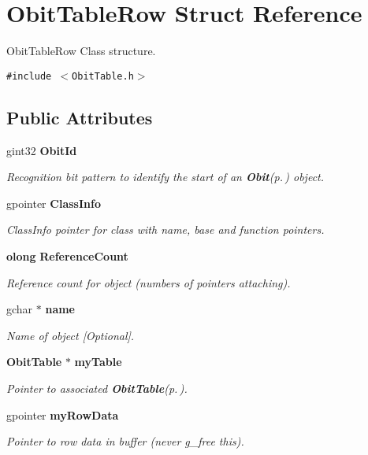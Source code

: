 \section{Obit\-Table\-Row Struct Reference}
\label{structObitTableRow}
Obit\-Table\-Row Class structure.  


{\tt \#include $<$Obit\-Table.h$>$}

\subsection*{Public Attributes}
\begin{CompactItemize}
\item 
gint32 {\bf Obit\-Id}
\begin{CompactList}\small\item\em Recognition bit pattern to identify the start of an {\bf Obit}{\rm (p.\,\pageref{structObit})} object. \item\end{CompactList}\item 
gpointer {\bf Class\-Info}
\begin{CompactList}\small\item\em Class\-Info pointer for class with name, base and function pointers. \item\end{CompactList}\item 
{\bf olong} {\bf Reference\-Count}
\begin{CompactList}\small\item\em Reference count for object (numbers of pointers attaching). \item\end{CompactList}\item 
gchar $\ast$ {\bf name}
\begin{CompactList}\small\item\em Name of object [Optional]. \item\end{CompactList}\item 
{\bf Obit\-Table} $\ast$ {\bf my\-Table}
\begin{CompactList}\small\item\em Pointer to associated {\bf Obit\-Table}{\rm (p.\,\pageref{structObitTable})}. \item\end{CompactList}\item 
gpointer {\bf my\-Row\-Data}
\begin{CompactList}\small\item\em Pointer to row data in buffer (never g\_\-free this). \item\end{CompactList}\end{CompactItemize}


